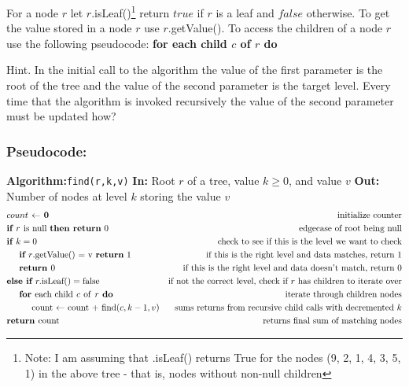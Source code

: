 \documentclass[12pt]{article}
\begin{document}
For a node $r$ let $r$.isLeaf()\footnote[1]{Note: I am assuming that .isLeaf() returns True for the nodes (9, 2, 1, 4, 3, 5, 1) in the above tree - that is, nodes without non-null children} return $true$ if $r$ is a leaf and $false$ otherwise. To get the value stored in a node $r$ use $r$.getValue(). To access the children of a node $r$ use the following pseudocode:\newline
\hspace*{5mm}\textbf{for \textnormal{each child} $c$ \textnormal{of} $r$ do}

Hint. In the initial call to the algorithm the value of the first parameter is the root of the tree and the
value of the second parameter is the target level. Every time that the algorithm is invoked recursively
the value of the second parameter must be updated how?

\pagebreak

\subsubsection*{Pseudocode:}

\textbf{Algorithm:}\texttt{find(r,k,v)}\newline
\textbf{In: }\normalfont{}Root $r$ of a tree, value $k \geq 0$, and value $v$\newline
\textbf{Out: }\normalfont{}Number of nodes at level $k$ storing the value $v$
\begin{align*}    
&\textbf{$count$ $\leftarrow$ 0} &\text{initialize counter}\\
&\textbf{if $r$ \normalfont{is null} \textbf{then return} $0$} &\text{edgecase of root being null}\\
&\textbf{if $k = 0$} &\text{check to see if this is the level we want to check}\\
&\hspace*{5mm}\textbf{if \normalfont{$r$.getValue() = v} \textbf{return} 1} &\text{if this is the right level and data matches, return 1}\\
&\hspace*{5mm}\textbf{return } 0 &\text{if this is the right level and data doesn't match, return 0}\\
&\textbf{else if } r.\textnormal{isLeaf()} = \text{false} &\text{if not the correct level, check if $r$ has children to iterate over}\\
&\hspace*{5mm}\textbf{for \textnormal{each child} $c$ \textnormal{of} $r$ do} &\text{iterate through children nodes}\\
&\hspace*{10mm}\text{count $\leftarrow$ count + find$(c,k-1,v)$}&\text{sums returns from recursive child calls with decremented $k$}\\
&\textbf{return } \textnormal{count}&\text{returns final sum of matching nodes}\\
\end{align*}
\end{document}
